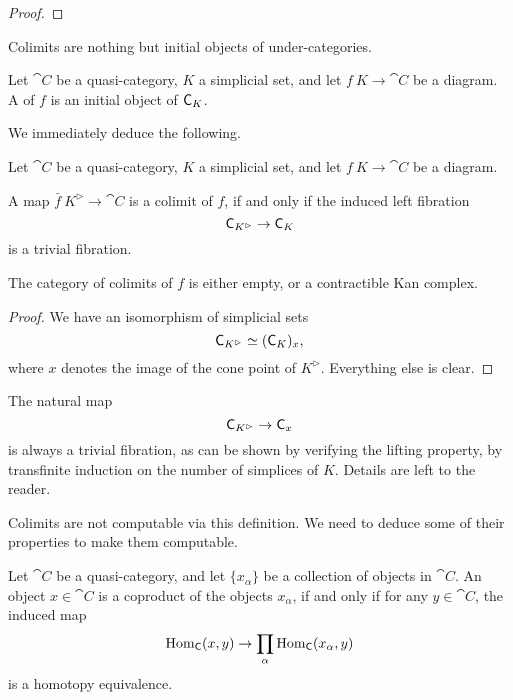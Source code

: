\begin{proof}
    \nyw
\end{proof}

Colimits are nothing but initial objects of under-categories.

\begin{definition}
    Let $\cat C$ be a quasi-category,
    $K$ a simplicial set,
    and let $f\:K\to\cat C$ be a diagram.
    A  of $f$ is an initial object of $\mathsf{C}_{K\/}$.
\end{definition}

We immediately deduce the following.

\begin{corollary}
    Let $\cat C$ be a quasi-category,
    $K$ a simplicial set,
    and let $f\:K\to\cat C$ be a diagram.
    \begin{itms}
        \item A map $\bar f\:K^\vartriangleright\to\cat C$
        is a colimit of $f$, if and only if
        the induced left fibration
        \[ \mathsf{C}_{K^\vartriangleright\/}\to\mathsf{C}_{K\/} \]
        is a trivial fibration.
        \item The category of colimits of $f$ 
        is either empty, or a contractible Kan complex.
    \end{itms}
\end{corollary}

\begin{proof}
    We have an isomorphism of simplicial sets
    \[ \mathsf{C}_{K^\vartriangleright\/}\simeq(\mathsf{C}_{K\/})_{x\/}, \]
    where $x$ denotes the image of the cone point of $K^\vartriangleright$.
    Everything else is clear.
\end{proof}

\begin{remark}\label{thm-6-c}
    The natural map 
    \[ \mathsf{C}_{K^\vartriangleright\/}\to\mathsf{C}_{x\/} \]
    is always a trivial fibration,
    as can be shown by verifying the lifting property,
    by transfinite induction on the number of simplices of $K$.
    Details are left to the reader. \varqed
\end{remark}

Colimits are not computable via this definition.
We need to deduce some of their properties to make them computable.

\begin{proposition}\label{thm-6-z}
    Let $\cat C$ be a quasi-category,
    and let $\{x_\alpha\}$ be a collection of objects in $\cat C$.
    An object $x\in\cat C$ is a coproduct of the objects $x_\alpha$,
    if and only if for any $y\in\cat C$, the induced map 
    \[ \operatorname{Hom}_{\mathsf{C}}(x,y)\to\prod_\alpha\operatorname{Hom}_{\mathsf{C}}(x_\alpha,y) \]
    is a homotopy equivalence.
\end{proposition}

